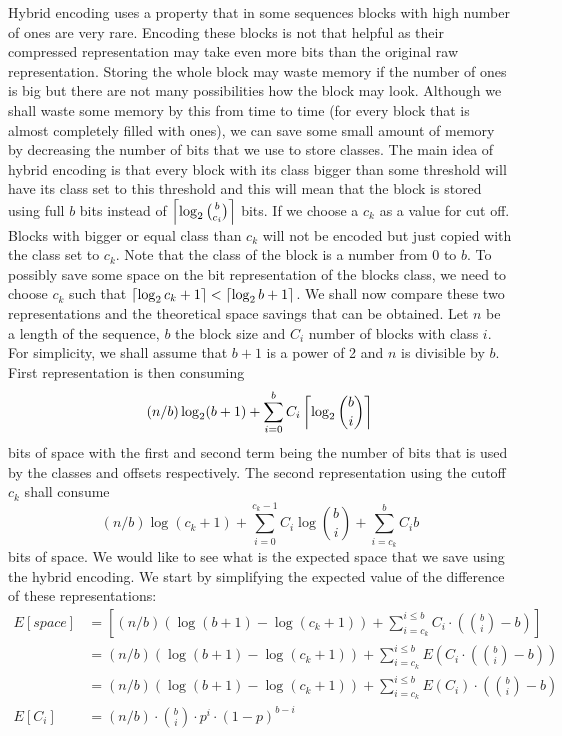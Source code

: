 Hybrid encoding uses a property that in some sequences blocks with high number
of ones are very rare. Encoding these blocks is not that helpful as their
compressed representation may take even more bits than the original raw
representation. Storing the whole block may waste memory if the number of
ones is big but there are not many possibilities how the block may look.
Although we shall waste some memory by this from time to time (for every
block that is almost completely filled with ones), we can save some small
amount of memory by decreasing the number of bits that we use to store
classes. The main idea of hybrid encoding is that every block with its
class bigger than some threshold will have its class set to this threshold
and this will mean that the block is stored using full $b$ bits instead of
$\left\lceil \log_2{b\choose c_i} \right\rceil$ bits. If we choose a $c_k$ as a value for cut off.
Blocks with bigger or equal class than $c_k$ will not be encoded but just
copied with the class set to $c_k$. Note that the class of the block
is a number from 0 to $b$. To possibly save some space on the bit representation
of the blocks class, we need to choose $c_k$ such that $\left\lceil \log_2 c_k+1 \right\rceil < \left\lceil \log_2 b+1 \right\rceil$.
We shall now compare these two representations and the theoretical space savings that
can be obtained. Let $n$ be a length of the sequence, $b$ the block size and $C_i$
number of blocks with class $i$. For simplicity, we shall assume that $b+1$ is a
power of 2 and $n$ is divisible by $b$. First representation is then
consuming $$(n/b)\log_2 (b+1) + \sum_{i=0}^{b} C_i\left\lceil \log_2 {b\choose i} \right\rceil$$
bits of space with the first and second term being the number of bits that
is used by the classes and offsets respectively. The second representation
using the cutoff $c_k$ shall consume $$(n/b)\log (c_k+1)+\sum_{i=0}^{c_k-1}C_i\log {b\choose i} + \sum_{i=c_k}^{b}C_i b$$
bits of space. We would like to see what is the expected space that we save
using the hybrid encoding. We start by simplifying the expected value of the
difference of these representations:
\begin{align*}
E[space] &= \left[(n/b)(\log (b+1) - \log (c_k+1)) + \sum_{i=c_k}^{i\leq b}C_i\cdot \left({b\choose i} - b\right)\right]\\
&=(n/b)(\log (b+1) - \log (c_k+1)) + \sum_{i=c_k}^{i\leq b}E\left(C_i\cdot \left({b\choose i} - b\right)\right)\\
&=(n/b)(\log (b+1) - \log (c_k+1)) + \sum_{i=c_k}^{i\leq b}E(C_i)\cdot \left({b\choose i} - b\right)\\
E[C_i] &= (n/b)\cdot {b\choose i}\cdot p^i\cdot (1-p)^{b-i}
\end{align*}

